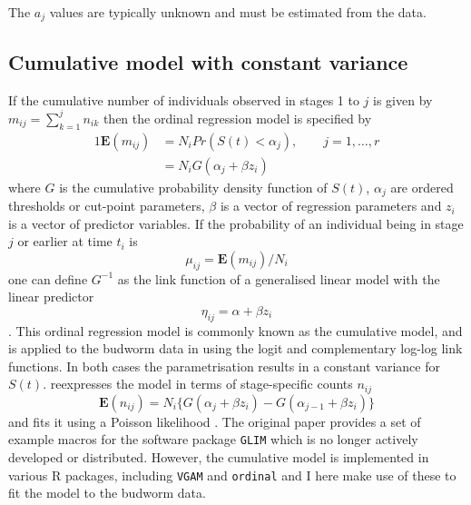 The $a_j$ values are typically unknown and must be estimated from the data.

\subsection{Cumulative model with constant variance }
If the cumulative number of individuals observed in stages 1 to $j$ is given by $m_{ij}=\sum_{k=1}^jn_{ik}$ then the ordinal regression model \citep{mccullagh1980regression} is specified by %
\begin{alignat}{1}
\mathbf{E}(m_{ij})&=N_iPr(S(t) < \alpha_j), \qquad j = 1,\dots ,r\\
&=N_iG(\alpha_j + \beta z_i)
\end{alignat}
where $G$ is the cumulative probability density function of $S(t)$, $\alpha_j$ are ordered thresholds or cut-point parameters, $\beta$ is a vector of regression parameters and $z_i$ is a vector of predictor variables.
If the probability of an individual being in stage $j$ or earlier at time $t_i$ is $$\mu_{ij} = \mathbf{E}(m_{ij})/N_i$$ one can define $G^{-1}$ as the link function of a generalised linear model with the linear predictor $$\eta_{ij}=\alpha+\beta z_i$$. This ordinal regression model is commonly known as the cumulative model, and is applied to the budworm data in \citep{candy1991modeling} using the logit and complementary log-log link functions. In  both cases the parametrisation results in a constant variance for $S(t)$. \citet{candy1991modeling} reexpresses the model in terms of stage-specific counts $n_{ij}$  
\begin{equation}
\mathbf{E}(n_{ij})=N_i\{G(\alpha_j + \beta z_i) - G(\alpha_{j-1} + \beta z_i)\}
\end{equation}
and fits it using a Poisson likelihood \citep{thompson1981composite}. The original paper provides a set of example macros for the software package \verb+GLIM+ \citep{aitkin1989statistical} which is no longer actively developed or distributed. However, the cumulative model is implemented in various R packages, including \verb+VGAM+ \citep{VGAM} and \verb+ordinal+ \cite{ordinal} and I here make use of these to fit the model to the budworm data.
